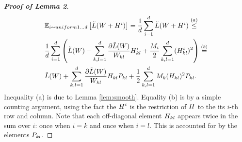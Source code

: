 \documentclass{article}
\begin{document}

\begin{proof}[\bf{Proof of Lemma 2}]
\begin{align*}
&\mathbb{E}_{i \sim uniform 1 \ldots d} \left[ \tilde{L}({W} + {H}^i) \right] = \frac{1}{d} \sum_{i=1}^d \tilde{L}({W} + {H}^i) \stackrel{(a)}{\leq} \\
& \frac{1}{d} \sum_{i=1}^d \left(\tilde{L}({W}) + \sum_{k,l=1}^d \frac{\partial \tilde{L}({W})}{{W}_{kl}} {H}_{kl}^i + \frac{M_i}{2} \sum_{k,l=1}^d  ({H}_{kl}^i)^2 \right) \stackrel{(b)}{=} \\
& \tilde{L}({W}) + \sum_{k,l=1}^d \frac{\partial \tilde{L}({W})}{{W}_{kl}} {H}_{kl} {P}_{kl} + \frac{1}{2} \sum_{k,l=1}^d M_k ({H}_{kl})^2 {P}_{kl}.
\end{align*}
Inequality (a) is due to Lemma \ref{lem:smooth}. Equality (b) is by a simple counting argument, using the fact the ${H}^i$ is the restriction of ${H}$ to the its $i$-th row and column. Note that each off-diagonal element ${H}_{kl}$ appears twice in the sum over $i$: once when $i=k$ and once when $i=l$. This is accounted for by the elements ${P}_{kl}$.
\end{proof}
\end{document}

